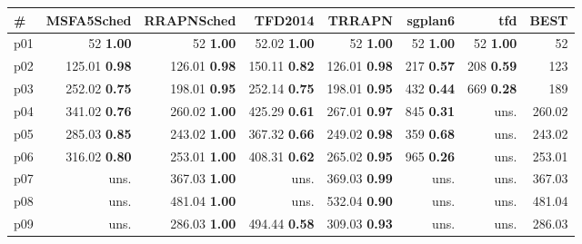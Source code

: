 \begin{tabular}{lrrrrrrr}
\toprule
\textbf{\#} & \textbf{MSFA5Sched} & \textbf{RRAPNSched} & \textbf{TFD2014} & \textbf{TRRAPN} & \textbf{sgplan6} & \textbf{tfd} & \textbf{BEST}\\
\midrule
\multicolumn{1}{l|}{p01} & {\footnotesize 52} \textbf{1.00} & {\footnotesize 52} \textbf{1.00} & {\footnotesize 52.02} \textbf{1.00} & {\footnotesize 52} \textbf{1.00} & {\footnotesize 52} \textbf{1.00} & {\footnotesize 52} \textbf{1.00} & \multicolumn{1}{|r}{52}\\
\multicolumn{1}{l|}{p02} & {\footnotesize 125.01} \textbf{0.98} & {\footnotesize 126.01} \textbf{0.98} & {\footnotesize 150.11} \textbf{0.82} & {\footnotesize 126.01} \textbf{0.98} & {\footnotesize 217} \textbf{0.57} & {\footnotesize 208} \textbf{0.59} & \multicolumn{1}{|r}{123}\\
\multicolumn{1}{l|}{p03} & {\footnotesize 252.02} \textbf{0.75} & {\footnotesize 198.01} \textbf{0.95} & {\footnotesize 252.14} \textbf{0.75} & {\footnotesize 198.01} \textbf{0.95} & {\footnotesize 432} \textbf{0.44} & {\footnotesize 669} \textbf{0.28} & \multicolumn{1}{|r}{189}\\
\multicolumn{1}{l|}{p04} & {\footnotesize 341.02} \textbf{0.76} & {\footnotesize 260.02} \textbf{1.00} & {\footnotesize 425.29} \textbf{0.61} & {\footnotesize 267.01} \textbf{0.97} & {\footnotesize 845} \textbf{0.31} & uns. & \multicolumn{1}{|r}{260.02}\\
\multicolumn{1}{l|}{p05} & {\footnotesize 285.03} \textbf{0.85} & {\footnotesize 243.02} \textbf{1.00} & {\footnotesize 367.32} \textbf{0.66} & {\footnotesize 249.02} \textbf{0.98} & {\footnotesize 359} \textbf{0.68} & uns. & \multicolumn{1}{|r}{243.02}\\
\multicolumn{1}{l|}{p06} & {\footnotesize 316.02} \textbf{0.80} & {\footnotesize 253.01} \textbf{1.00} & {\footnotesize 408.31} \textbf{0.62} & {\footnotesize 265.02} \textbf{0.95} & {\footnotesize 965} \textbf{0.26} & uns. & \multicolumn{1}{|r}{253.01}\\
\multicolumn{1}{l|}{p07} & uns. & {\footnotesize 367.03} \textbf{1.00} & uns. & {\footnotesize 369.03} \textbf{0.99} & uns. & uns. & \multicolumn{1}{|r}{367.03}\\
\multicolumn{1}{l|}{p08} & uns. & {\footnotesize 481.04} \textbf{1.00} & uns. & {\footnotesize 532.04} \textbf{0.90} & uns. & uns. & \multicolumn{1}{|r}{481.04}\\
\multicolumn{1}{l|}{p09} & uns. & {\footnotesize 286.03} \textbf{1.00} & {\footnotesize 494.44} \textbf{0.58} & {\footnotesize 309.03} \textbf{0.93} & uns. & uns. & \multicolumn{1}{|r}{286.03}\\

\end{tabular}
